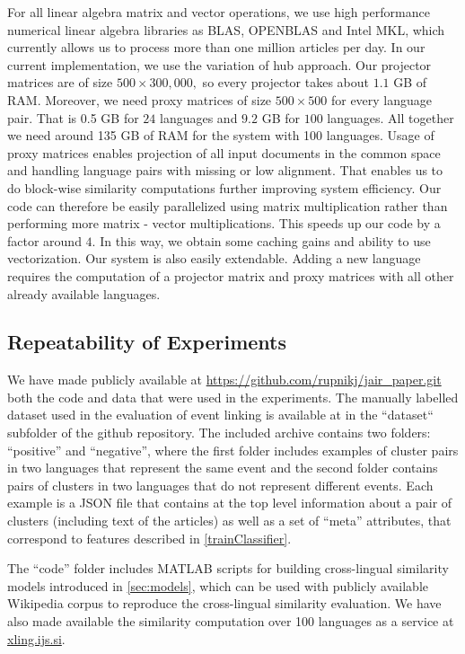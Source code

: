 \documentclass[twoside,11pt]{article}
\begin{document}
For all linear algebra matrix and vector operations, we use high performance numerical linear algebra libraries as BLAS, OPENBLAS and Intel MKL, which currently allows us to process more than one million articles per day.
In our current implementation, we use the variation of hub approach. Our projector matrices are of size $500\times 300,000,$ so every projector takes about $1.1$ GB of RAM. Moreover, we need proxy matrices of size $500\times500$ for every language pair. That is 0.5 GB for $24$ languages and $9.2$ GB for $100$ languages. All together we need around 135 GB of RAM for the system with 100 languages.
 Usage of proxy matrices enables projection of all input documents in the common space and handling language pairs with missing or low alignment. That enables us to do block-wise similarity computations further improving system efficiency. Our code can therefore be easily parallelized using matrix multiplication rather than performing more matrix - vector multiplications. This speeds up our code by a factor around $4.$ In this way, we obtain some caching gains and ability to use vectorization.
Our system is also easily extendable. Adding a new language requires the  computation of  a projector matrix and proxy matrices with all other already available languages.

\subsection{Repeatability of Experiments}
We have made publicly available at \url{https://github.com/rupnikj/jair_paper.git} both the code and data that were used in the experiments.
The manually labelled dataset used in the evaluation of event linking is available at in the ``dataset`` subfolder of the github repository. The included archive contains two folders: ``positive'' and ``negative'', where the first folder includes examples of cluster pairs in two languages that represent the same event and the second folder contains pairs of clusters in two languages that do not represent different events. Each example is a JSON file that contains at the top level information about a pair of clusters (including text of the articles) as well as a set of ``meta'' attributes, that correspond to features described in \ref{trainClassifier}.

The ``code'' folder includes MATLAB scripts for building cross-lingual similarity models introduced in \ref{sec:models}, which can be used with publicly available Wikipedia corpus to reproduce the cross-lingual similarity evaluation. We have also made available the similarity computation over 100 languages as a service at \url{xling.ijs.si}.
\end{document}
